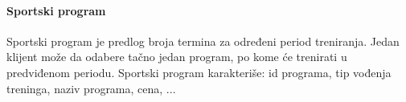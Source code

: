 \documentclass[../main.tex]{subfiles}
\begin{document}
\paragraph{Sportski program}
Sportski program je predlog broja termina za određeni period treniranja. Jedan klijent može da odabere tačno jedan program, po kome će trenirati u predviđenom periodu.
Sportski program karakteriše: id programa, tip vođenja treninga, naziv programa, cena, ...
\end{document}
